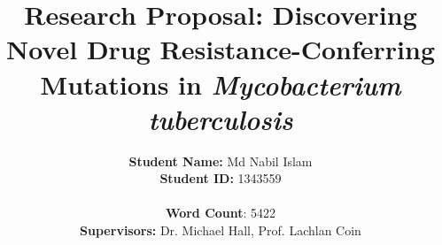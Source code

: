 \documentclass[12pt]{article}
\begin{document}
\title{\textbf{Research Proposal}: Discovering Novel Drug Resistance-Conferring Mutations in \textit{Mycobacterium tuberculosis} }

\author{
\textbf{Student Name:} Md Nabil Islam\\
\textbf{Student ID:} 1343559\\\\
\textbf{Word Count}: 5422\\
\textbf{Supervisors:} Dr. Michael Hall, Prof. Lachlan Coin
}
\date{}
\maketitle

\newpage
\tableofcontents
\newpage




\printbibliography
\end{document}
